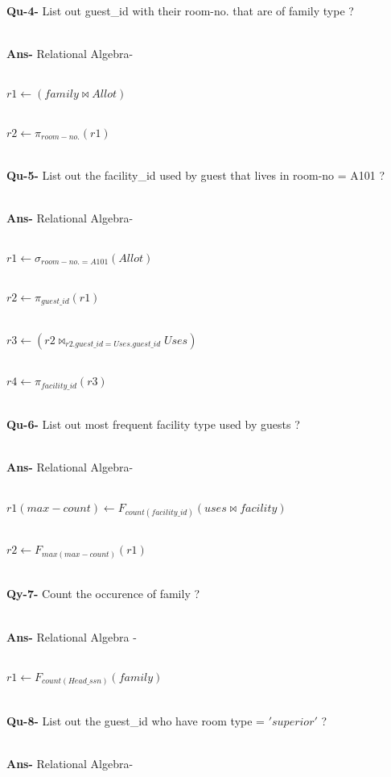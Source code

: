 \documentclass[a4,12pt]{report}
\begin{document}
\begin{flushleft}
\textbf{Qu-4-} List out guest\_id with their room-no. that are of family type ?\\\

\textbf{Ans-} Relational Algebra- \\\

			$ r1 \leftarrow (family \bowtie Allot) $ \\\
			
			$ r2 \leftarrow \pi_{room-no.}(r1) $ \\\
			
\textbf{Qu-5-} List out the facility\_id used by guest that lives in room-no = A101 ? \\\

\textbf{ Ans- } Relational Algebra- \\\

			$ r1 \leftarrow \sigma_{room-no. = A101}(Allot) $ \\\
			
			$ r2 \leftarrow \pi_{guest\_id}(r1) $ \\\
			
			$ r3 \leftarrow (r2 \bowtie_{r2.guest\_id = Uses.guest\_id} Uses) $ \\\
			
			$ r4 \leftarrow \pi_{facility\_id}(r3) $ \\\
			
\textbf{Qu-6-} List out most frequent facility type used by guests ? \\\

\textbf{Ans-} Relational Algebra- \\\

			$ r1(max-count) \leftarrow F_{count(facility\_id)}(uses \bowtie facility) $ \\\
			
			$ r2 \leftarrow F_{max(max-count)}(r1) $  \\\
			
\textbf{ Qy-7-} Count the occurence of family ? \\\

\textbf{Ans-} Relational Algebra - \\\

			$ r1 \leftarrow F_{count(Head\_ssn)}(family) $ \\\
			
\textbf{Qu-8-} List out the guest\_id who have room type = $ 'superior' $ ? \\\

\textbf{Ans- } Relational Algebra- \\\


\end{flushleft}
\end{document}

